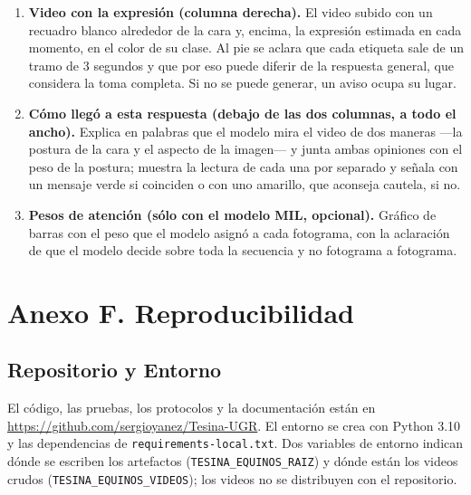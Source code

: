 \begin{enumerate}
  \item \textbf{Video con la expresión (columna derecha).} El video subido con un recuadro blanco alrededor de la cara y, encima, la expresión estimada en cada momento, en el color de su clase. Al pie se aclara que cada etiqueta sale de un tramo de 3 segundos y que por eso puede diferir de la respuesta general, que considera la toma completa. Si no se puede generar, un aviso ocupa su lugar.
  \item \textbf{Cómo llegó a esta respuesta (debajo de las dos columnas, a todo el ancho).} Explica en palabras que el modelo mira el video de dos maneras ---la postura de la cara y el aspecto de la imagen--- y junta ambas opiniones con el peso de la postura; muestra la lectura de cada una por separado y señala con un mensaje verde si coinciden o con uno amarillo, que aconseja cautela, si no.
  \item \textbf{Pesos de atención (sólo con el modelo MIL, opcional).} Gráfico de barras con el peso que el modelo asignó a cada fotograma, con la aclaración de que el modelo decide sobre toda la secuencia y no fotograma a fotograma.
\end{enumerate}

\section{Anexo F. Reproducibilidad}
\subsection{Repositorio y Entorno}
El código, las pruebas, los protocolos y la documentación están en \url{https://github.com/sergioyanez/Tesina-UGR}. El entorno se crea con Python 3.10 y las dependencias de \texttt{requirements-local.txt}. Dos variables de entorno indican dónde se escriben los artefactos (\texttt{TESINA\_EQUINOS\_RAIZ}) y dónde están los videos crudos (\texttt{TESINA\_EQUINOS\_VIDEOS}); los videos no se distribuyen con el repositorio.

